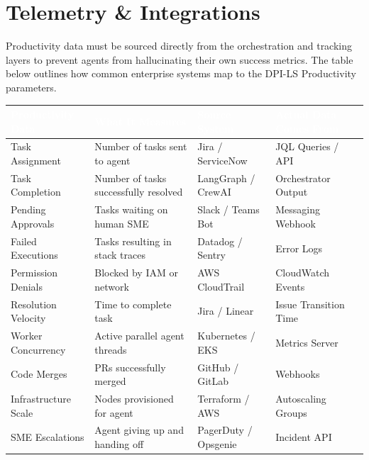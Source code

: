 \documentclass[11pt,a4paper]{article}
\begin{document}
\vspace{1cm}

\section{Telemetry \& Integrations}

Productivity data must be sourced directly from the orchestration and tracking layers to prevent agents from hallucinating their own success metrics. The table below outlines how common enterprise systems map to the DPI-LS Productivity parameters.

\vspace{0.5cm}
\begin{table}[H]
\centering
\renewcommand{\arraystretch}{1.4}
\begin{tabularx}{\textwidth}{| >{\raggedright\arraybackslash}X >{\raggedright\arraybackslash}X >{\raggedright\arraybackslash}p{3.5cm} >{\raggedright\arraybackslash}X |}
\hline
\rowcolor{dpiblue} \textcolor{white}{\textbf{Productivity Data}} & \textcolor{white}{\textbf{What It Measures}} & \textcolor{white}{\textbf{Source System}} & \textcolor{white}{\textbf{Actual Data Comes From}} \\
\hline
Task Assignment & Number of tasks sent to agent & Jira / ServiceNow & JQL Queries / API \\
Task Completion & Number of tasks successfully resolved & LangGraph / CrewAI & Orchestrator Output \\
Pending Approvals & Tasks waiting on human SME & Slack / Teams Bot & Messaging Webhook \\
Failed Executions & Tasks resulting in stack traces & Datadog / Sentry & Error Logs \\
Permission Denials & Blocked by IAM or network & AWS CloudTrail & CloudWatch Events \\
Resolution Velocity & Time to complete task & Jira / Linear & Issue Transition Time \\
Worker Concurrency & Active parallel agent threads & Kubernetes / EKS & Metrics Server \\
Code Merges & PRs successfully merged & GitHub / GitLab & Webhooks \\
Infrastructure Scale & Nodes provisioned for agent & Terraform / AWS & Autoscaling Groups \\
SME Escalations & Agent giving up and handing off & PagerDuty / Opsgenie & Incident API \\
\hline
\end{tabularx}
\end{table}
\vspace{0.5cm}
\end{document}
